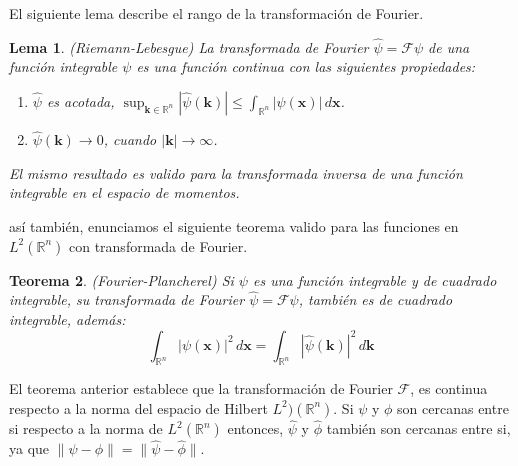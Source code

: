 \documentclass[12pt]{book}
\numberwithin{equation}{chapter}
\newtheorem{theorem}{Teorema}[chapter]
\newtheorem{lemma}[theorem]{Lema}
\def\R{\mathbb{R}}
\def\rar{\rightarrow}
\def\F{\mathcal{F}}
\def\x{\mathbf{x}}
\def\k{\mathbf{k}}
\begin{document}
\newpage

El siguiente lema describe el rango de la transformaci\'on de Fourier.
\begin{lemma} 
(Riemann-Lebesgue) La transformada de Fourier $\hat{\psi}= \F \psi$ de una funci\'on integrable $\psi$ es una funci\'on continua con las siguientes propiedades:
\begin{enumerate}
\item $\hat{\psi}$ es acotada, $ \sup_{\k \in \R^{n}} |\hat{\psi}(\k)| \leq \int_{\R^{n}} |\psi(\x)|\, d\x $. 
\item $ \hat{\psi}(\k) \rar 0 $, cuando $|\k|\rar \infty$.
\end{enumerate}
El mismo resultado es valido para la transformada inversa de una funci\'on integrable en el espacio de momentos.
\end{lemma}

as\'i tambi\'en, enunciamos el siguiente teorema valido para las funciones en $L^{2}(\R^{n})$ con transformada de Fourier.

\begin{theorem}\label{FPt}
(Fourier-Plancherel) Si $\psi$ es una funci\'on integrable y de cuadrado integrable, su transformada de Fourier $\hat{\psi}= \F\psi $, tambi\'en es de cuadrado integrable, adem\'as:
$$ \int_{\R^{n}} |\psi(\x)|^{2}\, d\x = \int_{\R^{n}} |\hat{\psi}(\k)|^{2}\, d\k  $$
\end{theorem} 

El teorema anterior establece que la transformaci\'on de Fourier $\F$, es continua respecto a la norma del espacio de Hilbert $L^{2})(\R^{n})$. Si $\psi$ y $\phi$ son cercanas entre si respecto a la norma de $L^{2}(\R^{n})$ entonces, $\hat{\psi}$ y $\hat{\phi}$ tambi\'en son cercanas entre si, ya que $\| \psi - \phi \| = \| \hat{\psi} - \hat{\phi} \|$.  

\vspace{3 mm}
\end{document}
